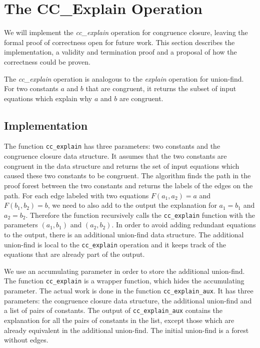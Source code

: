 \chapter{The CC\_Explain Operation}\label{chapter:cc-explain}


We will implement the \emph{cc\_explain} operation for congruence closure, leaving the formal proof of correctness open for future work.  This section describes the implementation, a validity and termination proof and a proposal of how the correctness could be proven.

The \emph{cc\_explain} operation is analogous to the \emph{explain} operation for union-find. For two constants $a$ and $b$ that are congruent, it returns the subset of input equations which explain why $a$ and $b$ are congruent.

\section{Implementation}

The function \lstinline{cc_explain} has three parameters: two constants and the congruence closure data structure.
It assumes that the two constants are congruent in the data structure and returns the set of input equations which caused these two constants to be congruent. The algorithm finds the path in the proof forest between the two constants and returns the labels of the edges on the path. For each edge labeled with two equations $F(a_1, a_2) = a$ and $F(b_1, b_2) = b$, we need to also add to the output the explanation for $a_1 = b_1$ and $a_2 = b_2$. Therefore the function recursively calls the \lstinline{cc_explain} function with the parameters $(a_1, b_1)$ and $(a_2, b_2)$. In order to avoid adding redundant equations to the output, there is an additional union-find data structure. The additional union-find is local to the \lstinline{cc_explain} operation and it keeps track of the equations that are already part of the output.

We use an accumulating parameter in order to store the additional union-find. The function \lstinline|cc_explain| is a wrapper function, which hides the accumulating parameter. The actual work is done in the function \lstinline|cc_explain_aux|.
It has three parameters: the congruence closure data structure, the additional union-find and a list of pairs of constants. The output of \lstinline{cc_explain_aux} contains the explanation for all the pairs of constants in the list, except those which are already equivalent in the additional union-find. The initial union-find is a forest without edges.

